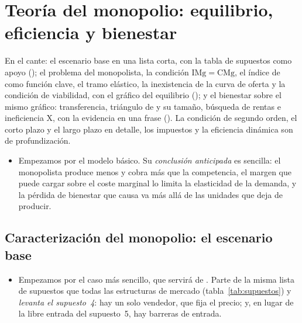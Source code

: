 \documentclass[11pt]{article}
\begin{document}
\section{Teoría del monopolio: equilibrio,\cortetitulo{} eficiencia y bienestar}\label{sec:teoria-monopolio-equilibrio}

\begin{notaopositor}
En el cante: el escenario base en una lista corta, con la tabla de supuestos como apoyo (); el problema del monopolista, la condición $\mathrm{IMg}=\mathrm{CMg}$, el índice de  como función clave, el tramo elástico, la inexistencia de la curva de oferta y la condición de viabilidad, con el gráfico del equilibrio (); y el bienestar sobre el mismo gráfico: transferencia, triángulo de  y su tamaño, búsqueda de rentas e ineficiencia X, con la evidencia en una frase (). La condición de segundo orden, el corto plazo y el largo plazo en detalle, los impuestos y la eficiencia dinámica son de profundización.
\end{notaopositor}

\begin{itemize}
\item Empezamos por el modelo básico. Su \emph{conclusión anticipada} es sencilla: el monopolista produce menos y cobra más que la competencia, el margen que puede cargar sobre el coste marginal lo limita la elasticidad de la demanda, y la pérdida de bienestar que causa va más allá de las unidades que deja de producir.
\end{itemize}

\subsection{Caracterización del monopolio: el escenario base}\label{sec:caracterizacion-monopolio-escenario}

\begin{itemize}
\item Empezamos por el caso más sencillo, que servirá de . Parte de la misma lista de supuestos que todas las estructuras de mercado (tabla~\ref{tab:supuestos}) y \emph{levanta el supuesto~4}: hay un solo vendedor, que fija el precio; y, en lugar de la libre entrada del supuesto~5, hay barreras de entrada.
\end{itemize}
\end{document}
